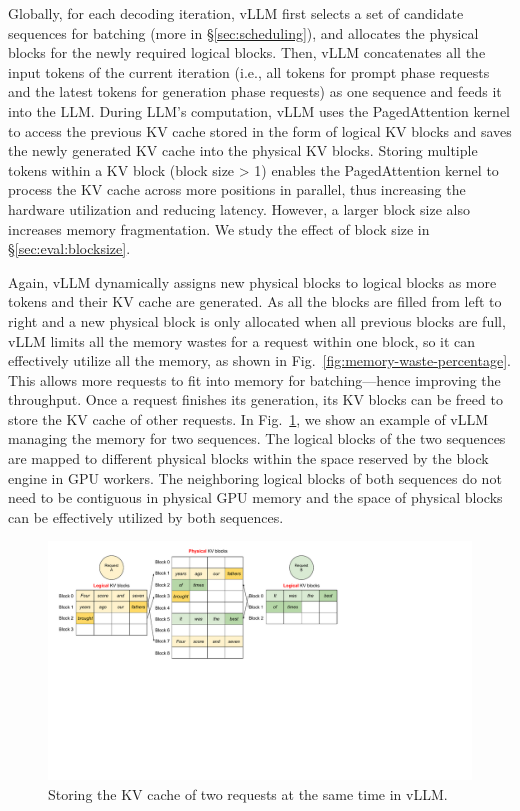 \documentclass[sigplan,10pt]{acmart}
\newcommand{\tech}[0]{PagedAttention\xspace}
\newcommand{\sys}[0]{vLLM\xspace}
\begin{document}
Globally, for each decoding iteration, \sys first selects a set of candidate sequences for batching (more in \S\ref{sec:scheduling}), and allocates the physical blocks for the newly required logical blocks. Then, \sys concatenates all the input tokens of the current iteration (i.e., all tokens for prompt phase requests and the latest tokens for generation phase requests) as one sequence and feeds it into the LLM. During LLM's computation, \sys uses the \tech kernel to access the previous KV cache stored in the form of logical KV blocks and saves the newly generated KV cache into the physical KV blocks. 
Storing multiple tokens within a KV block (block size > 1) enables the \tech kernel to process the KV cache across more positions in parallel, thus increasing the hardware utilization and reducing latency. However, a larger block size also increases memory fragmentation. We study the effect of block size in \S\ref{sec:eval:blocksize}.

Again, \sys dynamically assigns new physical blocks to logical blocks as more tokens and their KV cache are generated. As all the blocks are filled from left to right and a new physical block is only allocated when all previous blocks are full, \sys limits all the memory wastes for a request within one block, so it can effectively utilize all the memory, as shown in Fig.~\ref{fig:memory-waste-percentage}. This allows more requests to fit into memory for batching---hence improving the throughput. Once a request finishes its generation, its KV blocks can be freed to store the KV cache of other requests. 
In Fig.~\ref{fig:multi-sequence-blocks}, we show an example of \sys managing the memory for two sequences. The logical blocks of the two sequences are mapped to different physical blocks within the space reserved by the block engine in GPU workers. The neighboring logical blocks of both sequences do not need to be contiguous in physical GPU memory and the space of physical blocks can be effectively utilized by both sequences.

\begin{figure}
    \centering
    \includegraphics[width=\columnwidth]{figures/multi-sequence-block-mapping.pdf}
    \vspace{-15pt}
    \caption{Storing the KV cache of two requests at the same time in \sys.}
    \label{fig:multi-sequence-blocks}
    \vspace{-10pt}
\end{figure}
\end{document}
